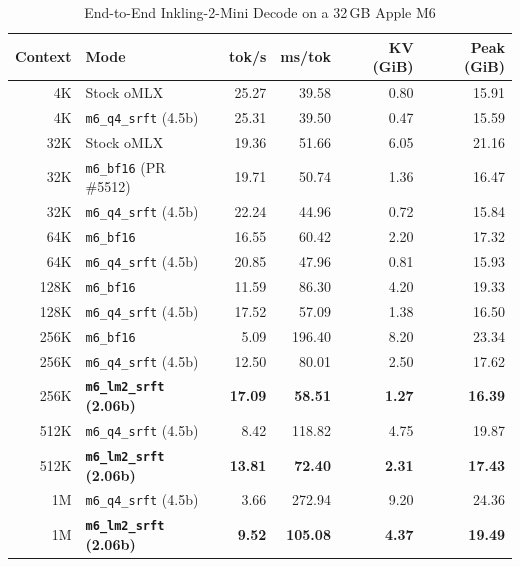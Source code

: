 \documentclass[conference]{IEEEtran}
\begin{document}
\begin{table}[t]
\centering
\caption{End-to-End Inkling-2-Mini Decode on a 32\,GB Apple M6}
\label{tab:scaling}
\setlength{\tabcolsep}{4pt}
\begin{tabular}{@{}r l r r r r@{}}
\toprule
Context & Mode & tok/s & ms/tok & KV (GiB) & Peak (GiB) \\
\midrule
4K & Stock oMLX & 25.27 & 39.58 & 0.80 & 15.91 \\
4K & \texttt{m6\_q4\_srft} (4.5b) & 25.31 & 39.50 & 0.47 & 15.59 \\
\midrule
32K & Stock oMLX & 19.36 & 51.66 & 6.05 & 21.16 \\
32K & \texttt{m6\_bf16} (PR \#5512) & 19.71 & 50.74 & 1.36 & 16.47 \\
32K & \texttt{m6\_q4\_srft} (4.5b) & 22.24 & 44.96 & 0.72 & 15.84 \\
\midrule
64K & \texttt{m6\_bf16} & 16.55 & 60.42 & 2.20 & 17.32 \\
64K & \texttt{m6\_q4\_srft} (4.5b) & 20.85 & 47.96 & 0.81 & 15.93 \\
\midrule
128K & \texttt{m6\_bf16} & 11.59 & 86.30 & 4.20 & 19.33 \\
128K & \texttt{m6\_q4\_srft} (4.5b) & 17.52 & 57.09 & 1.38 & 16.50 \\
\midrule
256K & \texttt{m6\_bf16} & 5.09 & 196.40 & 8.20 & 23.34 \\
256K & \texttt{m6\_q4\_srft} (4.5b) & 12.50 & 80.01 & 2.50 & 17.62 \\
256K & \textbf{\texttt{m6\_lm2\_srft} (2.06b)} & \textbf{17.09} & \textbf{58.51} & \textbf{1.27} & \textbf{16.39} \\
\midrule
512K & \texttt{m6\_q4\_srft} (4.5b) & 8.42 & 118.82 & 4.75 & 19.87 \\
512K & \textbf{\texttt{m6\_lm2\_srft} (2.06b)} & \textbf{13.81} & \textbf{72.40} & \textbf{2.31} & \textbf{17.43} \\
\midrule
1M & \texttt{m6\_q4\_srft} (4.5b) & 3.66 & 272.94 & 9.20 & 24.36 \\
1M & \textbf{\texttt{m6\_lm2\_srft} (2.06b)} & \textbf{9.52} & \textbf{105.08} & \textbf{4.37} & \textbf{19.49} \\
\bottomrule
\end{tabular}
\end{table}
\end{document}
